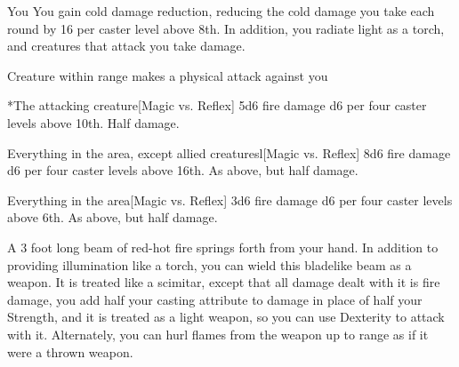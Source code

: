 \spelldur{\durshort \dismissable}
\begin{spelltarget}{You}
    \spelleffect You gain cold damage reduction, reducing the cold damage you take each round by 16  per caster level above 8th. In addition, you radiate light as a torch, and creatures that attack you take damage.
\end{spelltarget}
\begin{spelltrigger}{Creature within \rngclose range makes a physical attack against you}
    \begin{spelltarget}*{The attacking creature}[Magic vs. Reflex]
        \spellsuccess 5d6 fire damage \add d6 per four caster levels above 10th.
        \spellfailure Half damage.
    \end{spelltarget}
\end{spelltrigger}

\begin{spelltargets}{Everything in the area, except allied creatures}l[Magic vs. Reflex]
    \spellsuccess 8d6 fire damage \add d6 per four caster levels above 16th.
    \spellfailure As above, but half damage.
\end{spelltargets}

\begin{spelltargets}{Everything in the area}[Magic vs. Reflex]
    \spellsuccess 3d6 fire damage \add d6 per four caster levels above 6th.
    \spellfailure As above, but half damage.
\end{spelltargets}
\spellnotes \destructivespellnotes

\firespellnotes

\spelldur{\durlong \dismissable}
\spelleffect A 3 foot long beam of red-hot fire springs forth from your hand. In addition to providing illumination like a torch, you can wield this bladelike beam as a weapon. It is treated like a scimitar, except that all damage dealt with it is fire damage, you add half your casting attribute to damage in place of half your Strength, and it is treated as a light weapon, so you can use Dexterity to attack with it. Alternately, you can hurl flames from the weapon up to \rngmed range as if it were a thrown weapon.
\spellnotes \firespellnotes

